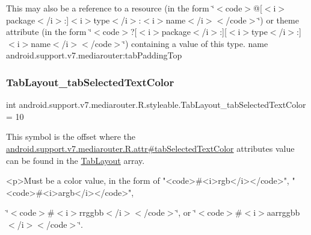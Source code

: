 This may also be a reference to a resource (in the form \char`\"{}$<$code$>$@\mbox{[}$<$i$>$package$<$/i$>$\+:\mbox{]}$<$i$>$type$<$/i$>$\+:$<$i$>$name$<$/i$>$$<$/code$>$\char`\"{}) or theme attribute (in the form \char`\"{}$<$code$>$?\mbox{[}$<$i$>$package$<$/i$>$\+:\mbox{]}\mbox{[}$<$i$>$type$<$/i$>$\+:\mbox{]}$<$i$>$name$<$/i$>$$<$/code$>$\char`\"{}) containing a value of this type.  name android.\+support.\+v7.\+mediarouter\+:tab\+Padding\+Top \mbox{\label{classandroid_1_1support_1_1v7_1_1mediarouter_1_1R_1_1styleable_ab2614637dac3cf097bf39bb86f81cddf}} 
\subsubsection{\texorpdfstring{Tab\+Layout\+\_\+tab\+Selected\+Text\+Color}{TabLayout\_tabSelectedTextColor}}
{\footnotesize\ttfamily int android.\+support.\+v7.\+mediarouter.\+R.\+styleable.\+Tab\+Layout\+\_\+tab\+Selected\+Text\+Color = 10\hspace{0.3cm}{\ttfamily [static]}}

This symbol is the offset where the \hyperlink{classandroid_1_1support_1_1v7_1_1mediarouter_1_1R_1_1attr_a72d9cff66ac0341f5746840927dcd013}{android.\+support.\+v7.\+mediarouter.\+R.\+attr\#tab\+Selected\+Text\+Color} attribute\textquotesingle{}s value can be found in the \hyperlink{classandroid_1_1support_1_1v7_1_1mediarouter_1_1R_1_1styleable_a94de1350e0a902b4a974d775f2f4f25e}{Tab\+Layout} array.

\begin{DoxyVerb}      <p>Must be a color value, in the form of "<code>#<i>rgb</i></code>", "<code>#<i>argb</i></code>",
\end{DoxyVerb}
 \char`\"{}$<$code$>$\#$<$i$>$rrggbb$<$/i$>$$<$/code$>$\char`\"{}, or \char`\"{}$<$code$>$\#$<$i$>$aarrggbb$<$/i$>$$<$/code$>$\char`\"{}. 

